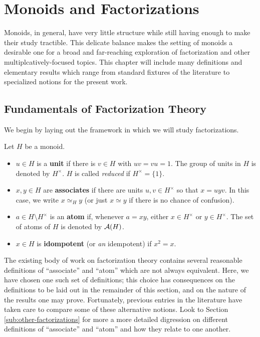 \chapter{Monoids and Factorizations} \label{ch:fundamentals}
Monoids, in general, have very little structure while still having enough to make their study tractible.
This delicate balance makes the setting of monoids a desirable one for a broad and far-reaching exploration of factorization and other multiplcatively-focused topics.
This chapter will include many definitions and elementary results which range from standard fixtures of the literature to specialized notions for the present work.

\section{Fundamentals of Factorization Theory} \label{subsec:factorizations}
We begin by laying out the framework in which we will study factorizations.

\begin{defn} \label{defn:atom}
	Let $H$ be a monoid.
	\begin{itemize}
		\item $u\in H$ is a \textbf{unit} if there is $v\in H$ with $uv = vu = 1$.  
		The group of units in $H$ is denoted by $H^\times$.  
		$H$ is called \textit{reduced} if $H^\times = \{1\}$.
		\item $x,y\in H$ are \textbf{associates} if there are units $u,v\in H^\times$ so that $x = uyv$. In this case, we write $x \simeq_H y$ (or just $x\simeq y$ if there is no chance of confusion).
		\item $a\in H\setminus H^\times$ is an \textbf{atom} if, whenever $a = xy$, either $x\in H^\times$ or $y\in H^\times$. The set of atoms of $H$ is denoted by $\mathcal{A}(H)$.
		\item $x\in H$ is \textbf{idompotent} (or \textit{an} idempotent) if $x^2 = x$.
	\end{itemize}
\end{defn}

The existing body of work on factorization theory contains several reasonable definitions of ``associate'' and ``atom'' which are not always equivalent.
Here, we have chosen one such set of definitions; this choice has consequences on the definitions to be laid out in the remainder of this section, and on the nature of the results one may prove.
Fortunately, previous entries in the literature have taken care to compare some of these alternative notions.
Look to Section \ref{sub:other-factorizations} for more a more detailed digression on different definitions of ``associate'' and ``atom'' and how they relate to one another.

